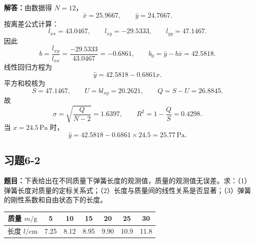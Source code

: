 \documentclass[UTF8,zihao=-4]{ctexart}
\newcommand{\problem}[1]{\subsection*{#1}}
\newcommand{\timu}{\noindent\textbf{题目：}}
\newcommand{\jieda}{\noindent\textbf{解答：}}
\begin{document}
{\jieda 由数据得 $N=12$，
\begin{equation*}
    \bar x=25.9667,
    \qquad
    \bar y=24.7667.
\end{equation*}
按离差公式计算：
\begin{equation*}
    l_{xx}=43.0467,
    \qquad
    l_{xy}=-29.5333,
    \qquad
    l_{yy}=47.1467.
\end{equation*}
因此
\begin{equation*}
    b=\frac{l_{xy}}{l_{xx}}=\frac{-29.5333}{43.0467}=-0.6861,
    \qquad
    b_0=\bar y-b\bar x=42.5818.
\end{equation*}
线性回归方程为
\begin{equation*}
    \hat y=42.5818-0.6861x.
\end{equation*}
平方和校核为
\begin{equation*}
    S=47.1467,
    \qquad
    U=bl_{xy}=20.2621,
    \qquad
    Q=S-U=26.8845.
\end{equation*}
故
\begin{equation*}
    \sigma=\sqrt{\frac{Q}{N-2}}=1.6397,
    \qquad
    R^2=1-\frac{Q}{S}=0.4298.
\end{equation*}
当 $x=24.5\,\mathrm{Pa}$ 时，
\begin{equation*}
    \hat y=42.5818-0.6861\times24.5=25.77\,\mathrm{Pa}.
\end{equation*}

\newpage

\problem{习题6-2}
\timu 下表给出在不同质量下弹簧长度的观测值，质量的观测值无误差。求：（1）弹簧长度对质量的定标关系式；（2）长度与质量间的线性关系是否显著；（3）弹簧的刚性系数和自由状态下的长度。

\begin{center}
\small
\begin{tabular}{c|cccccc}
\toprule
质量 $m/\mathrm{g}$ & 5 & 10 & 15 & 20 & 25 & 30\\
\midrule
长度 $l/\mathrm{cm}$ & 7.25 & 8.12 & 8.95 & 9.90 & 10.9 & 11.8\\
\bottomrule
\end{tabular}
\end{center}

}
\end{document}
